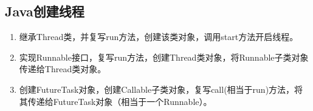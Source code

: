 \documentclass[../../../interview-questions.tex]{subfiles}
\begin{document}
\subsection{Java创建线程}

\begin{enumerate}
    \item {继承Thread类，并复写run方法，创建该类对象，调用start方法开启线程。}
    \item{实现Runnable接口，复写run方法，创建Thread类对象，将Runnable子类对象传递给Thread类对象。}
    \item{创建FutureTask对象，创建Callable子类对象，复写call(相当于run)方法，将其传递给FutureTask对象（相当于一个Runnable）。}
\end{enumerate}
\end{document}
